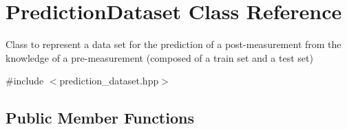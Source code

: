 \hypertarget{classPredictionDataset}{\section{Prediction\-Dataset Class Reference}
\label{classPredictionDataset}
}


Class to represent a data set for the prediction of a post-\/measurement from the knowledge of a pre-\/measurement (composed of a train set and a test set)  




{\ttfamily \#include $<$prediction\-\_\-dataset.\-hpp$>$}

\subsection*{Public Member Functions}
